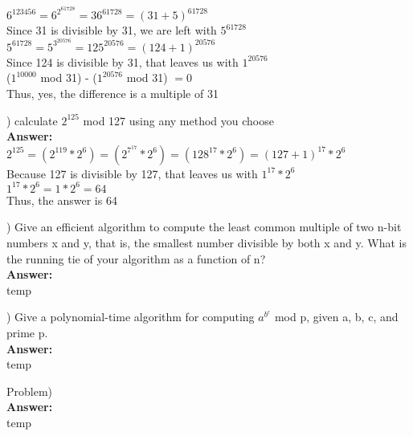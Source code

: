 \documentclass{article}
\begin{document}
\indent $6^{123456} = 6^{2^61728} = 36^{61728} = (31 + 5)^{61728}$ \\
\indent Since 31 is divisible by 31, we are left with $5^{61728}$ \\
\indent $5^{61728} = 5^{3^{20576}} = 125^{20576} = (124 + 1)^{20576}$ \\
\indent Since 124 is divisible by 31, that leaves us with $1^{20576}$ \\

\indent ($1^{10000}$ mod 31) - ($1^{20576}$ mod 31) $= 0$ \\
\indent Thus, yes, the difference is a multiple of 31

\vspace{.3in}
) calculate $2^{125}$ mod 127 using any method you choose \\
\vspace{.1in}
{\bf Answer:} \\
\indent $2^{125} = (2^{119}* 2^6) = (2^{7^{17}}* 2^6) = (128^{17}* 2^6) = (127 + 1)^{17}*2^6$ \\
\indent Because 127 is divisible by 127, that leaves us with $1^{17}*2^6$ \\
\indent $1^{17}*2^6 = 1 * 2^6 = 64$ \\
\indent Thus, the answer is 64

\vspace{.3in}
) Give an efficient algorithm to compute the least common multiple of two 
\indent n-bit numbers x and y, that is, the smallest number divisible by both x and 
\indent y. What is the running tie of your algorithm as a function of n? \\
\vspace{.1in}
{\bf Answer:} \\
\indent temp

\vspace{.3in}
) Give a polynomial-time algorithm for computing $a^{b^c}$ mod p, given a, b, c, 
\indent and prime p. \\
\vspace{.1in}
{\bf Answer:} \\
\indent temp

\vspace{.3in}
\noindent Problem) \\
\vspace{.1in}
{\bf Answer:} \\
\indent temp
\end{document}
